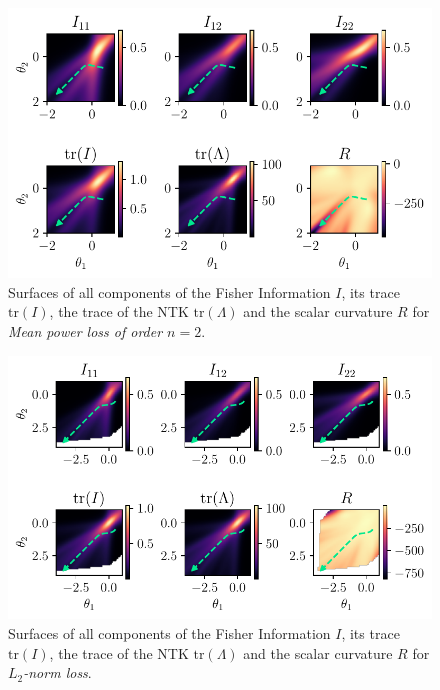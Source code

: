 \begin{figure}
	\centering
	\includegraphics{Experiment2/plots/MeanPowerLoss2_tracecomparison.pdf}
	\caption{Surfaces of all components of the Fisher Information $I$, its trace $\mathrm{tr}(I)$, the trace of the NTK $\mathrm{tr}(\Lambda)$ and the scalar curvature $R$ for \emph{Mean power loss of order $n=2$}.}
	\label{fig:Results2MeanPowerLoss}
\end{figure}

\begin{figure}
	\centering
	\includegraphics{Experiment2/plots/LPNormLoss2_tracecomparison.pdf}
	\caption{Surfaces of all components of the Fisher Information $I$, its trace $\mathrm{tr}(I)$, the trace of the NTK $\mathrm{tr}(\Lambda)$ and the scalar curvature $R$ for \emph{$L_2$-norm loss}.}
	\label{fig:Results2LPNormLoss}
\end{figure}

